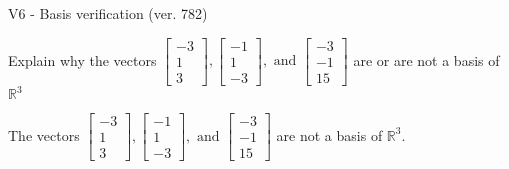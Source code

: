 \begin{exercise}
  \begin{exerciseTitle}V6 - Basis verification (ver. 782)\end{exerciseTitle}
  \begin{exerciseStatement}
    Explain why the vectors \(\left[\begin{array}{r}
-3 \\
1 \\
3
\end{array}\right] , \left[\begin{array}{r}
-1 \\
1 \\
-3
\end{array}\right] , \text{ and } \left[\begin{array}{r}
-3 \\
-1 \\
15
\end{array}\right]\) are or are not a basis of \(\mathbb{R}^3\)	


  \end{exerciseStatement}
  \begin{exerciseAnswer}
   The vectors \(\left[\begin{array}{r}
-3 \\
1 \\
3
\end{array}\right] , \left[\begin{array}{r}
-1 \\
1 \\
-3
\end{array}\right] , \text{ and } \left[\begin{array}{r}
-3 \\
-1 \\
15
\end{array}\right]\) 
  	 are not  a basis of \(\mathbb{R}^3\).
  


  \end{exerciseAnswer}
\end{exercise}